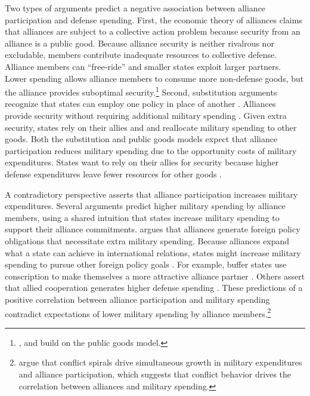 \documentclass[12pt]{article}
\begin{document}
Two types of arguments predict a negative association between alliance participation and defense spending. 
First, the economic theory of alliances \citep{OlsonZeckhauser1966} claims that alliances are subject to a collective action problem because security from an alliance is a public good.
Because alliance security is neither rivalrous nor excludable, members contribute inadequate resources to collective defense. 
Alliance members can ``free-ride'' and smaller states exploit larger partners. 
Lower spending allows alliance members to consume more non-defense goods, but the alliance provides suboptimal security.\footnote{\citet{SandlerForbes1980}, \citet{Oneal1990} and \citet{SandlerHartley2001} build on the public goods model.} 
Second, substitution arguments recognize that states can employ one policy in place of another \citep{MostStarr1989}.
Alliances provide security without requiring additional military spending \citep{Morrow1993, Conybeare1994}. 
Given extra security, states rely on their allies and and reallocate military spending to other goods. 
Both the substitution and public goods models expect that alliance participation reduces military spending due to the opportunity costs of military expenditures. 
States want to rely on their allies for security because higher defense expenditures leave fewer resources for other goods \citep{Fordham1998, Fearon2018}.


A contradictory perspective asserts that alliance participation increases military expenditures. 
Several arguments predict higher military spending by alliance members, using a shared intuition that states increase military spending to support their alliance commitments. 
\citet{Diehl1994} argues that alliances generate foreign policy obligations that necessitate extra military spending.
Because alliances expand what a state can achieve in international relations, states might increase military spending to pursue other foreign policy goals \citep{MorganPalmer2006}.
For example, buffer states use conscription to make themselves a more attractive alliance partner \citep{Horowitzetal2017}.
Others assert that allied cooperation generates higher defense spending \citep{Palmer1990, QuirozFlores2011}. 
These predictions of a positive correlation between alliance participation and military spending contradict expectations of lower military spending by alliance members.\footnote{
\citet{SeneseVasquez2008} argue that conflict spirals drive simultaneous growth in military expenditures and alliance participation, which suggests that conflict behavior drives the correlation between alliances and military spending. 
}
\end{document}
